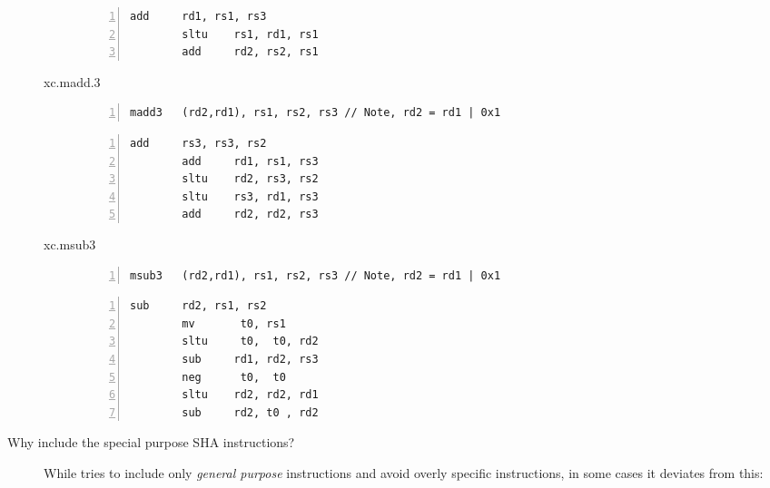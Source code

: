 \begin{description}
\begin{description}
        \begin{lstlisting}[frame=single, title=RISC-V RV32IM / RV64IM,numbers=left]
        add     rd1, rs1, rs3
        sltu    rs1, rd1, rs1
        add     rd2, rs2, rs1
        \end{lstlisting}

    \item[xc.madd.3] \hfill

        \begin{lstlisting}[frame=single,title=XCrypto,numbers=left]
        madd3   (rd2,rd1), rs1, rs2, rs3 // Note, rd2 = rd1 | 0x1
        \end{lstlisting}

        \begin{lstlisting}[frame=single, title=RISC-V RV32IM / RV64IM,numbers=left]
        add     rs3, rs3, rs2
        add     rd1, rs1, rs3
        sltu    rd2, rs3, rs2
        sltu    rs3, rd1, rs3
        add     rd2, rd2, rs3
        \end{lstlisting}

    \item[xc.msub3] \hfill

        \begin{lstlisting}[frame=single,title=XCrypto,numbers=left]
        msub3   (rd2,rd1), rs1, rs2, rs3 // Note, rd2 = rd1 | 0x1
        \end{lstlisting}

        \begin{lstlisting}[frame=single, title=RISC-V RV32IM / RV64IM,numbers=left]
        sub     rd2, rs1, rs2
        mv       t0, rs1
        sltu     t0,  t0, rd2
        sub     rd1, rd2, rs3
        neg      t0,  t0
        sltu    rd2, rd2, rd1
        sub     rd2, t0 , rd2
        \end{lstlisting}

    \end{description}


\item[Why include the special purpose SHA instructions?]
      While \XCID tries to include only {\em general purpose} instructions and
      avoid overly specific instructions, in some cases it deviates from this:


\end{description}
